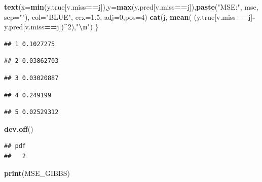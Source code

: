 \documentclass[12pt]{article}
\newenvironment{Shaded}{\begin{snugshade}}{\end{snugshade}}
\newcommand{\AttributeTok}[1]{\textcolor[rgb]{0.13,0.29,0.53}{#1}}
\newcommand{\DecValTok}[1]{\textcolor[rgb]{0.00,0.00,0.81}{#1}}
\newcommand{\FloatTok}[1]{\textcolor[rgb]{0.00,0.00,0.81}{#1}}
\newcommand{\FunctionTok}[1]{\textcolor[rgb]{0.13,0.29,0.53}{\textbf{#1}}}
\newcommand{\NormalTok}[1]{#1}
\newcommand{\SpecialCharTok}[1]{\textcolor[rgb]{0.81,0.36,0.00}{\textbf{#1}}}
\newcommand{\StringTok}[1]{\textcolor[rgb]{0.31,0.60,0.02}{#1}}
\begin{document}
\begin{Shaded}
\begin{Highlighting}[]
\FunctionTok{text}\NormalTok{(}\AttributeTok{x=}\FunctionTok{min}\NormalTok{(y.true[v.miss}\SpecialCharTok{==}\NormalTok{j]),}\AttributeTok{y=}\FunctionTok{max}\NormalTok{(y.pred[v.miss}\SpecialCharTok{==}\NormalTok{j]),}\FunctionTok{paste}\NormalTok{(}\StringTok{"MSE:"}\NormalTok{, mse, }\AttributeTok{sep=}\StringTok{""}\NormalTok{), }
     \AttributeTok{col=}\StringTok{"BLUE"}\NormalTok{, }\AttributeTok{cex=}\FloatTok{1.5}\NormalTok{, }\AttributeTok{adj=}\DecValTok{0}\NormalTok{,}\AttributeTok{pos=}\DecValTok{4}\NormalTok{)}
  \FunctionTok{cat}\NormalTok{(j, }\FunctionTok{mean}\NormalTok{( (y.true[v.miss}\SpecialCharTok{==}\NormalTok{j]}\SpecialCharTok{{-}}\NormalTok{ y.pred[v.miss}\SpecialCharTok{==}\NormalTok{j])}\SpecialCharTok{\^{}}\DecValTok{2}\NormalTok{),}\StringTok{"}\SpecialCharTok{\textbackslash{}n}\StringTok{"}\NormalTok{) \}}
\end{Highlighting}
\end{Shaded}

\begin{verbatim}
## 1 0.1027275
\end{verbatim}

\begin{verbatim}
## 2 0.03862703
\end{verbatim}

\begin{verbatim}
## 3 0.03020887
\end{verbatim}

\begin{verbatim}
## 4 0.249199
\end{verbatim}

\begin{verbatim}
## 5 0.02529312
\end{verbatim}

\begin{Shaded}
\begin{Highlighting}[]
\FunctionTok{dev.off}\NormalTok{()}
\end{Highlighting}
\end{Shaded}

\begin{verbatim}
## pdf 
##   2
\end{verbatim}

\begin{Shaded}
\begin{Highlighting}[]
\FunctionTok{print}\NormalTok{(MSE\_GIBBS)}
\end{Highlighting}
\end{Shaded}
\end{document}
